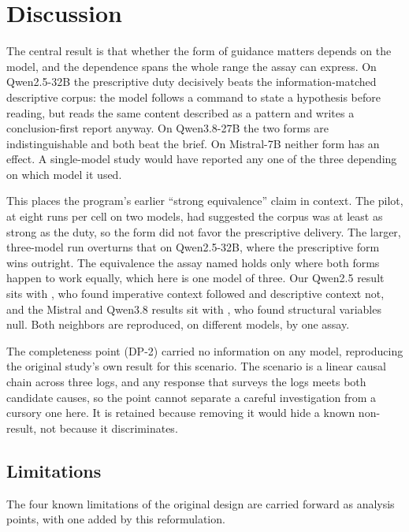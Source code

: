 \documentclass[11pt,a4paper]{article}
\begin{document}
\section{Discussion}

The central result is that whether the form of guidance matters depends on the model, and
the dependence spans the whole range the assay can express. On Qwen2.5-32B the prescriptive
duty decisively beats the information-matched descriptive corpus: the model follows a
command to state a hypothesis before reading, but reads the same content described as a
pattern and writes a conclusion-first report anyway. On Qwen3.8-27B the two forms are
indistinguishable and both beat the brief. On Mistral-7B neither form has an effect. A
single-model study would have reported any one of the three depending on which model it
used.

This places the program's earlier ``strong equivalence'' claim in context. The pilot, at
eight runs per cell on two models, had suggested the corpus was at least as strong as the
duty, so the form did not favor the prescriptive delivery. The larger, three-model run
overturns that on Qwen2.5-32B, where the prescriptive form wins outright. The
equivalence the assay named holds only where both forms happen to work equally, which here
is one model of three. Our Qwen2.5 result sits with \citet{gloaguen2026agents}, who found
imperative context followed and descriptive context not, and the Mistral and Qwen3.8
results sit with \citet{mcmillan2026instruction}, who found structural variables null.
Both neighbors are reproduced, on different models, by one assay.

The completeness point (DP-2) carried no information on any model, reproducing the
original study's own result for this scenario. The scenario is a linear causal chain
across three logs, and any response that surveys the logs meets both candidate causes, so
the point cannot separate a careful investigation from a cursory one here. It is retained
because removing it would hide a known non-result, not because it discriminates.

\subsection{Limitations}\label{sec:limitations}

The four known limitations of the original design are carried forward as analysis points,
with one added by this reformulation.
\end{document}
